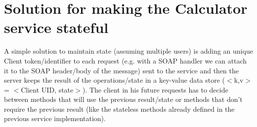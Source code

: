 \documentclass[a4paper]{article}
\begin{document}
\section*{Solution for making the Calculator service stateful}
A simple solution to maintain state (assuming multiple users) is adding an unique Client token/identifier to each request (e.g. with a SOAP handler we can attach it to the SOAP header/body of the message) sent to the service and then the server keeps the result of the operations/state in a key-value data store ($<$k,v$>$ = $<$Client UID, state$>$).  The client in his future requests has to decide between methods that will use the previous result/state or methods that don't require the previous result (like the stateless methods already defined in the previous service implementation).

 
\end{document}
